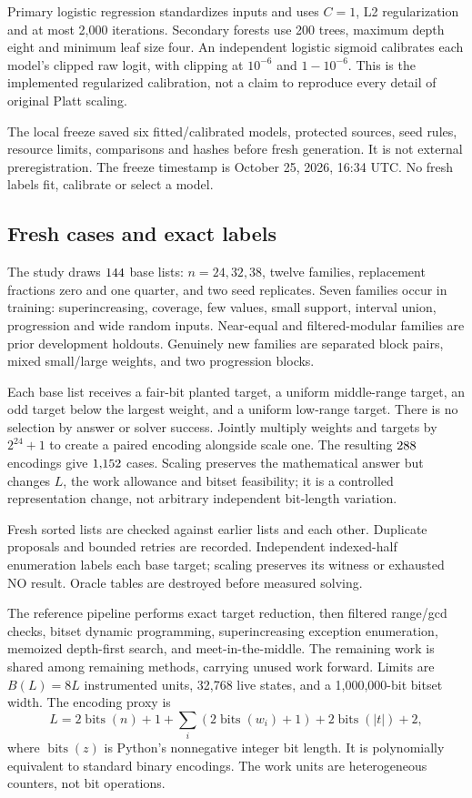 \documentclass[10pt,english]{article}
\newcommand{\bits}{\operatorname{bits}}
\begin{document}
Primary logistic regression standardizes inputs and uses \(C=1\), L2 regularization and at most 2,000 iterations. Secondary forests use 200 trees, maximum depth eight and minimum leaf size four. An independent logistic sigmoid calibrates each model's clipped raw logit, with clipping at \(10^{-6}\) and \(1-10^{-6}\). This is the implemented regularized calibration, not a claim to reproduce every detail of original Platt scaling.

The local freeze saved six fitted/calibrated models, protected sources, seed rules, resource limits, comparisons and hashes before fresh generation. It is not external preregistration. The freeze timestamp is October 25, 2026, 16:34 UTC. No fresh labels fit, calibrate or select a model.

\subsection{Fresh cases and exact labels}
The study draws \(144\) base lists: \(n=24,32,38\), twelve families, replacement fractions zero and one quarter, and two seed replicates. Seven families occur in training: superincreasing, coverage, few values, small support, interval union, progression and wide random inputs. Near-equal and filtered-modular families are prior development holdouts. Genuinely new families are separated block pairs, mixed small/large weights, and two progression blocks.

Each base list receives a fair-bit planted target, a uniform middle-range target, an odd target below the largest weight, and a uniform low-range target. There is no selection by answer or solver success. Jointly multiply weights and targets by \(2^{24}+1\) to create a paired encoding alongside scale one. The resulting \(288\) encodings give \(1{,}152\) cases. Scaling preserves the mathematical answer but changes \(L\), the work allowance and bitset feasibility; it is a controlled representation change, not arbitrary independent bit-length variation.

Fresh sorted lists are checked against earlier lists and each other. Duplicate proposals and bounded retries are recorded. Independent indexed-half enumeration labels each base target; scaling preserves its witness or exhausted NO result. Oracle tables are destroyed before measured solving.

The reference pipeline performs exact target reduction, then filtered range/gcd checks, bitset dynamic programming, superincreasing exception enumeration, memoized depth-first search, and meet-in-the-middle. The remaining work is shared among remaining methods, carrying unused work forward. Limits are \(B(L)=8L\) instrumented units, 32,768 live states, and a 1,000,000-bit bitset width. The encoding proxy is
\[
L=2\bits(n)+1+\sum_i(2\bits(w_i)+1)+2\bits(|t|)+2,
\]
where \(\bits(z)\) is Python's nonnegative integer bit length. It is polynomially equivalent to standard binary encodings. The work units are heterogeneous counters, not bit operations.
\end{document}
